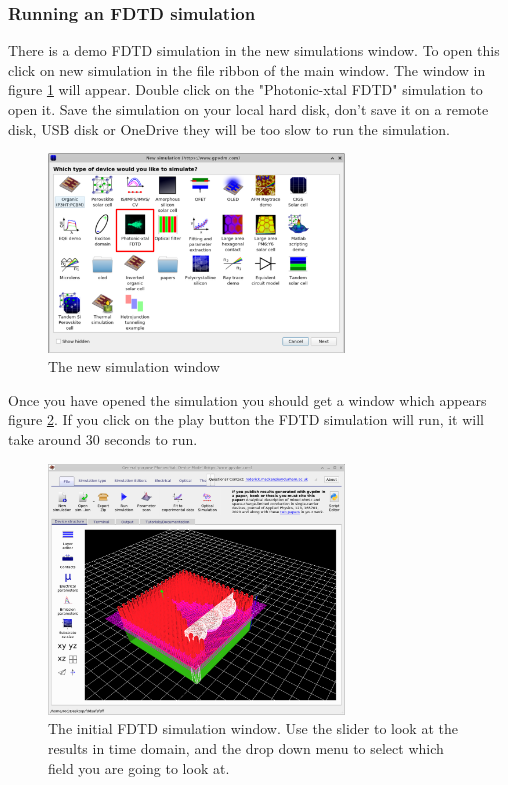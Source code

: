 \subsubsection{Running an FDTD simulation}
There is a demo FDTD simulation in the new simulations window. To open this click on new simulation in the file ribbon of the main window. The window in figure \ref{fig:fdtdnewdemo} will appear. Double click on the "Photonic-xtal FDTD" simulation to open it.  Save the simulation on your local hard disk, don't save it on a remote disk, USB disk or OneDrive they will be too slow to run the simulation.

\begin{figure}[H]
\centering
\includegraphics[width=0.7\textwidth]{./images/fdtd_1.png}
\caption{The new simulation window}
\label{fig:fdtdnewdemo}
\end{figure}

Once you have opened the simulation you should get a window which appears figure \ref{fig:fdtdfirstwindow}. If you click on the play button the FDTD simulation will run, it will take around 30 seconds to run.

\begin{figure}[H]
\centering
\includegraphics[width=0.7\textwidth]{./images/fdtd_2.png}
\caption{The initial FDTD simulation window. Use the slider to look at the results in time domain, and the drop down menu to select which field you are going to look at.}
\label{fig:fdtdfirstwindow}
\end{figure}

